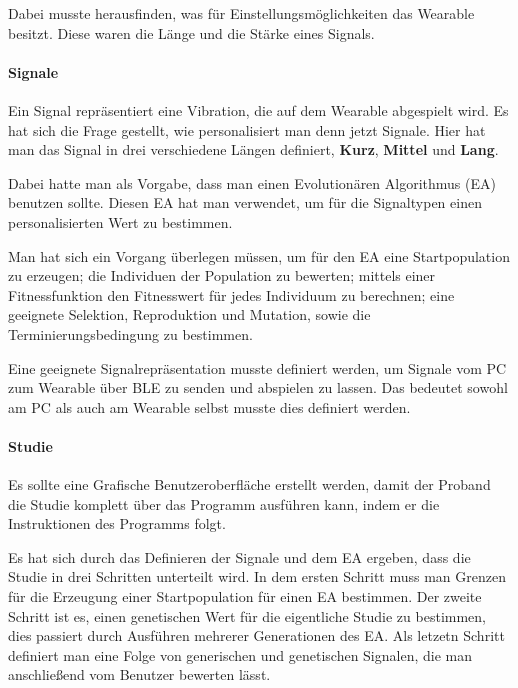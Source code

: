 Dabei musste herausfinden, was f{\"u}r Einstellungsm{\"o}glichkeiten das Wearable besitzt. Diese waren die L{\"a}nge und die St{\"a}rke eines Signals.

\paragraph{Signale}

Ein Signal repr{\"a}sentiert eine Vibration, die auf dem Wearable abgespielt wird. Es hat sich die Frage gestellt, wie personalisiert man denn jetzt Signale. Hier hat man das Signal in drei verschiedene L{\"a}ngen definiert, \textbf{Kurz}, \textbf{Mittel} und \textbf{Lang}. 

Dabei hatte man als Vorgabe, dass man einen Evolution{\"a}ren Algorithmus (EA) benutzen sollte.
Diesen EA hat man verwendet, um f{\"u}r die Signaltypen einen personalisierten Wert zu bestimmen.

Man hat sich ein Vorgang {\"u}berlegen m{\"u}ssen, um f{\"u}r den EA eine Startpopulation zu erzeugen; die Individuen der Population zu bewerten; mittels einer Fitnessfunktion den Fitnesswert f{\"u}r jedes Individuum zu berechnen; eine geeignete Selektion, Reproduktion und Mutation, sowie die Terminierungsbedingung zu bestimmen. 

Eine geeignete Signalrepr{\"a}sentation musste definiert werden, um Signale vom PC zum Wearable {\"u}ber BLE zu senden und abspielen zu lassen. Das bedeutet sowohl am PC als auch am Wearable selbst musste dies definiert werden.

\paragraph{Studie}

Es sollte eine Grafische Benutzeroberfl{\"a}che erstellt werden, damit der Proband die Studie komplett {\"u}ber das Programm ausf{\"u}hren kann, indem er die Instruktionen des Programms folgt.

Es hat sich durch das Definieren der Signale und dem EA ergeben, dass die Studie in drei Schritten unterteilt wird. 
In dem ersten Schritt muss man Grenzen f{\"u}r die Erzeugung einer Startpopulation f{\"u}r einen EA bestimmen.
Der zweite Schritt ist es, einen genetischen Wert f{\"u}r die eigentliche Studie zu bestimmen, dies passiert durch Ausf{\"u}hren mehrerer Generationen des EA. 
Als letzetn Schritt definiert man eine Folge von generischen und genetischen Signalen, die man anschlie{\ss}end vom Benutzer bewerten l{\"a}sst.


